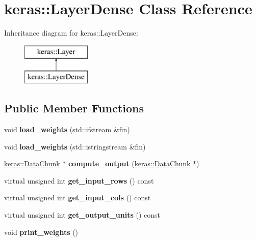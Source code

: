 \hypertarget{classkeras_1_1_layer_dense}{}\section{keras\+:\+:Layer\+Dense Class Reference}
\label{classkeras_1_1_layer_dense}
Inheritance diagram for keras\+:\+:Layer\+Dense\+:\begin{figure}[H]
\begin{center}
\leavevmode
\includegraphics[height=2.000000cm]{classkeras_1_1_layer_dense}
\end{center}
\end{figure}
\subsection*{Public Member Functions}
\begin{DoxyCompactItemize}
\item 
\mbox{\label{classkeras_1_1_layer_dense_a780d1734a559d29f3d91a862af17f2d2}} 
void {\bfseries load\+\_\+weights} (std\+::ifstream \&fin)
\item 
\mbox{\label{classkeras_1_1_layer_dense_ae6c3442631bcd63328d6d1a765f48bcd}} 
void {\bfseries load\+\_\+weights} (std\+::istringstream \&fin)
\item 
\mbox{\label{classkeras_1_1_layer_dense_a5e3344afb33d9fccd4dd754f264a0a09}} 
\mbox{\hyperlink{classkeras_1_1_data_chunk}{keras\+::\+Data\+Chunk}} $\ast$ {\bfseries compute\+\_\+output} (\mbox{\hyperlink{classkeras_1_1_data_chunk}{keras\+::\+Data\+Chunk}} $\ast$)
\item 
\mbox{\label{classkeras_1_1_layer_dense_af7f1e9d3e2fa71d7468a139dd4a00b6c}} 
virtual unsigned int {\bfseries get\+\_\+input\+\_\+rows} () const
\item 
\mbox{\label{classkeras_1_1_layer_dense_a75719cba61201688df9bac70736f8c85}} 
virtual unsigned int {\bfseries get\+\_\+input\+\_\+cols} () const
\item 
\mbox{\label{classkeras_1_1_layer_dense_a7cf1d66dba35c1fe9ae493cfd57d829f}} 
virtual unsigned int {\bfseries get\+\_\+output\+\_\+units} () const
\item 
\mbox{\label{classkeras_1_1_layer_dense_aae095c3b3e7f4bcdae2cd508f37d44a7}} 
void {\bfseries print\+\_\+weights} ()
\end{DoxyCompactItemize}
